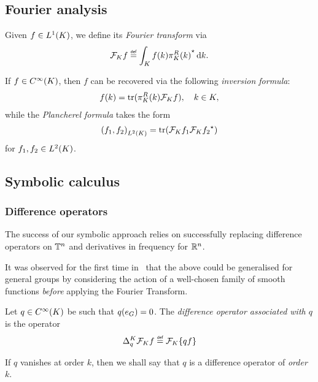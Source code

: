 \subsection{Fourier analysis}

Given $f \in \Lebesgue 1 \CompactGroup$,
we define its \emph{Fourier transform} via
\begin{align*}
    \Fourier [\CompactGroup] f \defeq \int_\CompactGroup f(k) \adj{\RightRegularRepresentation(k)} \dd k.
\end{align*}

If $f \in \SmoothFunctions \CompactGroup$,
then $f$ can be recovered via the following \emph{inversion formula}:
\begin{align*}
    f(k) = \tr(\RightRegularRepresentation(k) \Fourier [\CompactGroup] f),
    \quad k \in \CompactGroup,
\end{align*}
while the \emph{Plancherel formula} takes the form
\begin{align*}
    \ip [\Lebesgue 2 \CompactGroup] {f_1} {f_2}
    = \tr(\Fourier [\CompactGroup] f_1 \adj{\Fourier [\CompactGroup] f_2})
\end{align*}
for $f_1, f_2 \in \Lebesgue 2 \CompactGroup$.

\subsection{Symbolic calculus}

\subsubsection{Difference operators}

The success of our symbolic approach relies on successfully replacing difference operators on $\T^n$
and derivatives in frequency for $\R^n$.

It was observed for the first time in~\cite{RuzhanskyTurunen10}
that the above could be generalised for general groups by considering the action of a well-chosen family of smooth functions
\emph{before} applying the Fourier Transform.

\begin{definition}
    Let $q \in \SmoothFunctions \CompactGroup$ be such that $q(e_\Group) = 0$.
    The \emph{difference operator associated with $q$} is the operator
    \begin{align*}
        \DifferenceOperator [\CompactGroup] q \Fourier [\CompactGroup] f
        \defeq \Fourier [\CompactGroup] \{q f\}
    \end{align*}

    If $q$ vanishes at order $k$,
    then we shall say that $q$ is a difference operator of \emph{order} $k$.
\end{definition}

